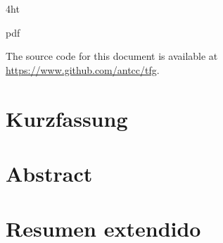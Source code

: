 \documentclass[
  fontsize=12pt,
  a4paper,  %
  twoside,  %
  bibliography=totoc,
  headsepline,
  cleardoublepage=empty,
  draft=false
]{scrbook}
\theoremstyle{nonumberplain}
\begin{document}

\frontmatter
\iftex4ht
  \Configure{$}{\PicMath}{\EndPicMath}{}

  {pdf}
  {%
  }
\fi


\Coverpage

\setlength{\parindent}{1.5em}
\linespread{1.1}

\pagestyle{empty}
\renewcommand*{\chapterpagestyle}{empty}
\pagebreak
\hspace{0pt}
\vfill
\begin{center}
    \begin{minipage}[t]{12.5cm}
        \doclicenseThis
        The source code for this document is available at \url{https://www.github.com/antcc/tfg}.
    \end{minipage}
\end{center}
\vfill
\hspace{0pt}
\pagebreak
\cleardoublepage


\pagestyle{preamble}
\renewcommand*{\chapterpagestyle}{preamble}



\ifdeutsch
  \section*{Kurzfassung}
\else
  \section*{Abstract}
\fi



\cleardoublepage

\section*{Resumen extendido}

\end{document}
